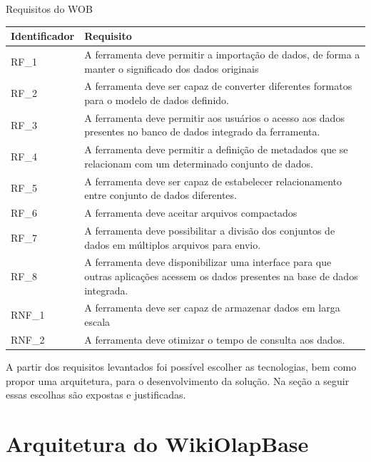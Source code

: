 \begin{quadro}[!htb]
    \centering
    \caption{Requisitos do WOB}
    \label{quadro:requisitos}
    \begin{tabular}{|p{2cm}|p{13cm}|}
        \hline
        Identificador   &   Requisito \\
        \hline
        RF\_1    &  A ferramenta deve permitir a importação de dados, de forma a manter o significado dos dados originais \\   
        \hline
        RF\_2    &  A ferramenta deve ser capaz de converter diferentes formatos para o modelo de dados definido. \\        
        \hline
        RF\_3    &  A ferramenta deve permitir aos usuários o acesso aos dados presentes no banco de dados integrado da ferramenta. \\
        \hline
        RF\_4    &  A ferramenta deve permitir a definição de metadados que se relacionam com um determinado conjunto de dados. \\
        \hline
        RF\_5    &  A ferramenta deve ser capaz de estabelecer relacionamento entre conjunto de dados diferentes. \\
        \hline
        RF\_6    &  A ferramenta deve aceitar arquivos compactados \\
        \hline
        RF\_7    &  A ferramenta deve possibilitar a divisão dos conjuntos de dados em múltiplos arquivos para envio. \\        
        \hline
        RF\_8    &  A ferramenta deve disponibilizar uma interface para que outras aplicações acessem os dados presentes na base de dados integrada. \\
        \hline
        RNF\_1    &  A ferramenta deve ser capaz de armazenar dados em larga escala \\
        \hline
        RNF\_2    &  A ferramenta deve otimizar o tempo de consulta aos dados. \\ 
        \hline   
    \end{tabular}
\end{quadro}

A partir dos requisitos levantados foi possível escolher as tecnologias, bem como propor uma 
arquitetura, para o desenvolvimento da solução. Na seção a seguir essas escolhas são expostas 
e justificadas.

\section{Arquitetura do WikiOlapBase}
\label{sec:arquitetura}

